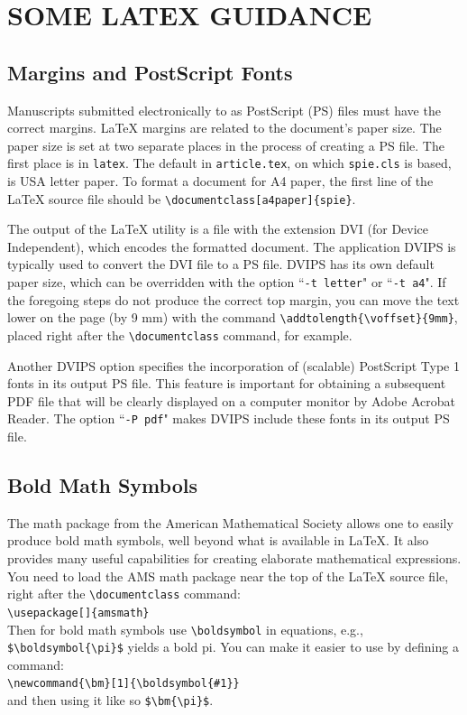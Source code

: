 \documentclass[]{spie}  %
\begin{document}
\section{SOME LATEX GUIDANCE} \label{sec:latex}

\subsection{Margins and PostScript Fonts}
 
Manuscripts submitted electronically to as PostScript (PS) files must have the correct margins. LaTeX margins are related to the document's paper size. The paper size is set at two separate places in the process of creating a PS file. The first place is in {\tt latex}. The default in {\tt article.tex}, on which {\tt spie.cls} is based, is USA letter paper. To format a document for A4 paper, the first line of the LaTeX source file should be \verb|\documentclass[a4paper]{spie}|.   

The output of the LaTeX utility is a file with the extension DVI (for Device Independent), which encodes the formatted document.  The application DVIPS is typically used to convert the DVI file to a PS file.  DVIPS has its own default paper size, which can be overridden with the option ``{\tt -t letter}" or ``{\tt -t a4}".  
If the foregoing steps do not produce the correct top margin, you can move the text lower on the page (by 9 mm) with the command \verb|\addtolength{\voffset}{9mm}|, placed right after the \verb|\documentclass| command, for example.

Another DVIPS option specifies the incorporation of (scalable) PostScript Type 1 fonts in its output PS file. This feature is important for obtaining a subsequent PDF file that will be clearly displayed on a computer monitor by Adobe Acrobat Reader.  The option ``{\tt -P pdf}" makes DVIPS include these fonts in its output PS file.

\subsection{Bold Math Symbols} 

The math package from the American Mathematical Society allows one to easily produce bold math symbols, well beyond what is available in LaTeX. It also provides many useful capabilities for creating elaborate mathematical expressions. You need to load the AMS math package near the top of the LaTeX source file, right after the \verb+\documentclass+ command:\\[1ex]
\verb+\usepackage[]{amsmath}+ \\[1ex]
Then for bold math symbols use \verb+\boldsymbol+ in equations, e.g., 
\verb+$\boldsymbol{\pi}$+ 
yields a bold pi.  You can make it easier to use by defining a command:\\[1ex]
\verb+\newcommand{\bm}[1]{\boldsymbol{#1}}+ \\[1ex]
and then using it like so \verb+$\bm{\pi}$+.
\end{document}
